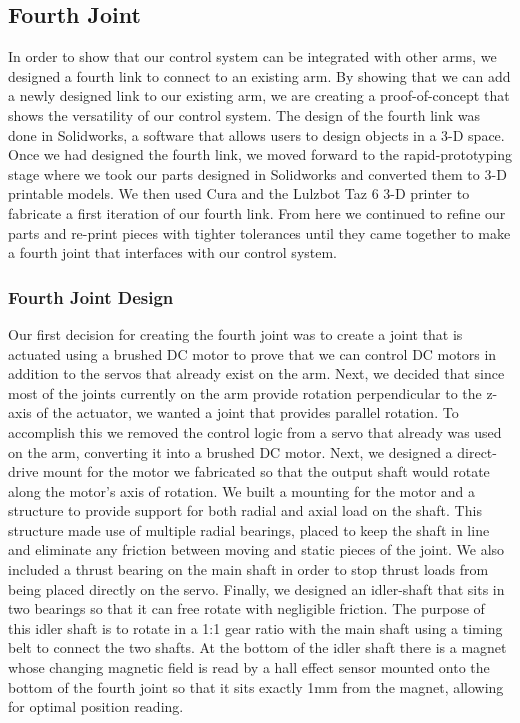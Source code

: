 \subsection{Fourth Joint}
In order to show that our control system can be integrated with other arms, we designed a fourth link to connect to an existing arm. By showing that we can add a newly designed link to our existing arm, we are creating a proof-of-concept that shows the versatility of our control system.  The design of the fourth link was done in Solidworks, a software that allows users to design objects in a 3-D space. Once we had designed the fourth link, we moved forward to the rapid-prototyping stage where we took our parts designed in Solidworks and converted them to 3-D printable models.  We then used Cura and the Lulzbot Taz 6 3-D printer to fabricate a first iteration of our fourth link.  From here we continued to refine our parts and re-print pieces with tighter tolerances until they came together to make a fourth joint that interfaces with our control system.  

\subsubsection{Fourth Joint Design}
Our first decision for creating the fourth joint was to create a joint that is actuated using a brushed DC motor to prove that we can control DC motors in addition to the servos that already exist on the arm.  Next, we decided that since most of the joints currently on the arm provide rotation perpendicular to the z-axis of the actuator, we wanted a joint that provides parallel rotation.  To accomplish this we removed the control logic from a servo that already was used on the arm, converting it into a brushed DC motor.  Next, we designed a direct-drive mount for the motor we fabricated so that the output shaft would rotate along the motor's axis of rotation.  We built a mounting for the motor and a structure to provide support for both radial and axial load on the shaft.  This structure made use of multiple radial bearings, placed to keep the shaft in line and eliminate any friction between moving and static pieces of the joint.  We also included a thrust bearing on the main shaft in order to stop thrust loads from being placed directly on the servo.  Finally, we designed an idler-shaft that sits in two bearings so that it can free rotate with negligible friction. The purpose of this idler shaft is to rotate in a 1:1 gear ratio with the main shaft using a timing belt to connect the two shafts.  At the bottom of the idler shaft there is a magnet whose changing magnetic field is read by a hall effect sensor mounted onto the bottom of the fourth joint so that it sits exactly 1mm from the magnet, allowing for optimal position reading.  

